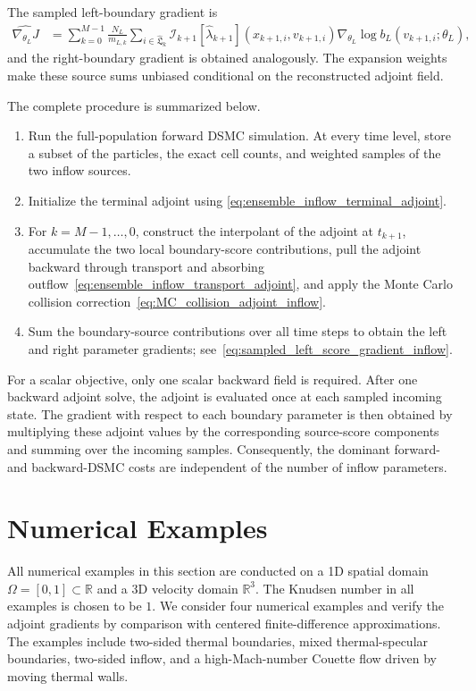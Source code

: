 \documentclass[12pt,nopreprintline]{elsarticle}
\begin{document}
The sampled left-boundary gradient is
\begin{align}
\widehat{\nabla_{\theta_L}J}
&=
\sum_{k=0}^{M-1}
\frac{N_L}{m_{L,k}}
\sum_{i\in\widehat{\mathfrak L}_k}
\mathcal I_{k+1}[\widehat\lambda_{k+1}]
(x_{k+1,i},v_{k+1,i})
\nabla_{\theta_L}\log b_L(v_{k+1,i};\theta_L),
\label{eq:sampled_left_score_gradient_inflow}
\end{align}
and the right-boundary gradient is obtained analogously. The expansion weights make these source sums unbiased conditional on the reconstructed adjoint field.

The complete procedure is summarized below.
\begin{enumerate}
\item Run the full-population forward DSMC simulation. At every time level, store a subset of the particles, the exact cell
counts, and weighted samples of the two inflow sources.
\item Initialize the terminal adjoint using
\eqref{eq:ensemble_inflow_terminal_adjoint}.
\item For $k=M-1,\ldots,0$, construct the interpolant of the adjoint at
$t_{k+1}$, accumulate the two local boundary-score contributions, pull the
adjoint backward through transport and absorbing outflow~\eqref{eq:ensemble_inflow_transport_adjoint}, and apply the
Monte Carlo collision correction~\eqref{eq:MC_collision_adjoint_inflow}.
\item Sum the boundary-source contributions over all time steps to obtain the
left and right parameter gradients; see~\eqref{eq:sampled_left_score_gradient_inflow}.
\end{enumerate}

For a scalar objective, only one scalar backward field is required. After one backward adjoint solve, the adjoint is evaluated once at each sampled incoming state. The gradient with respect to each boundary parameter is then obtained by multiplying these adjoint values by the corresponding source-score components and summing over the incoming samples. Consequently, the dominant forward- and backward-DSMC costs are independent of the number of inflow parameters.













\section{Numerical Examples} \label{sec:numerics}
All numerical examples in this section are conducted on a 1D spatial domain $\Omega = [0, 1] \subset \mathbb{R}$ and a 3D velocity domain $\mathbb{R}^3$. {The Knudsen number in all examples is chosen to be $1$.} We consider four numerical examples and verify the adjoint gradients by comparison with centered finite-difference approximations. The examples include two-sided thermal boundaries, mixed thermal-specular boundaries, two-sided inflow, and a high-Mach-number Couette flow driven by moving thermal walls.
\end{document}
